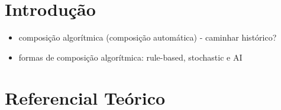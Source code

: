 \documentclass{automatextcc}
\begin{document}
\listoffigures

\listoftables


\chapter{Introdução}

\begin{itemize}
    \item composição algorítmica (composição automática) - caminhar histórico?
    \item formas de composição algorítmica: rule-based, stochastic e AI
\end{itemize}





\chapter{Referencial Teórico}

\end{document}

